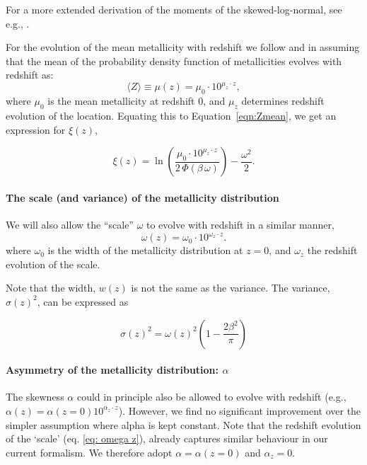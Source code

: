 \documentclass[twocolumn]{aastex631}
\begin{document}
For a more extended derivation of the moments of the skewed-log-normal, see e.g., \cite{WANG201995}.

\noindent For the evolution of the mean metallicity with redshift we follow \cite{Langer2006} and \cite{Neijssel+2019} in assuming that the mean of the probability density function of metallicities evolves with redshift as:
\begin{equation}
\label{eq: mean Z}
    \langle Z \rangle \equiv \mu(z) = \mu_0 \cdot 10^{\mu_z \cdot z},
\end{equation}
where $\mu_0
$ is the mean metallicity at redshift 0, and $\mu_z
$ determines redshift evolution of the location. Equating this to Equation~\ref{eqn:Zmean}, we get an expression for $\xi(z)$,


\begin{equation}
\label{eq mu z}
    \xi(z) = \ln\left(\frac{  \mu_0 \cdot 10^{\mu_z \cdot z} }{2\, \Phi(\beta\, \omega)}  \right) - \frac{\omega^2}{2}.
\end{equation}

\paragraph{The scale (and variance) of the metallicity distribution}

We will also allow the ``scale'' $\omega$ to evolve with redshift in a similar manner, 
\begin{equation}
\label{eq: omega z}
    \omega(z) = \omega_0 \cdot 10^{\omega_z \cdot z}.
\end{equation}
where $\omega_0$ is
the width of the metallicity distribution at $z=0$, and $\omega_z$
the redshift evolution of the scale.

Note that the width, $w(z)$ is not the same as the variance. The variance, $\sigma(z)^2$, can be expressed as

\begin{equation}
    \sigma(z)^2 = \omega(z)^2 \left( 1 - \frac{2\beta^2}{\pi} \right)
\end{equation}

\paragraph{Asymmetry of the metallicity distribution: $\alpha$}
The skewness $\alpha$ could in principle also be allowed to evolve with redshift (e.g., $\alpha (z) = \alpha(z=0) 10^{\alpha_z \cdot z}$). 
However, we find no significant improvement over the simpler assumption where alpha is kept constant. 
Note that the redshift evolution of the `scale' (eq. \ref{eq: omega z}), already captures similar behaviour in our current formalism. We therefore adopt $ \alpha = \alpha(z=0)$ and $\alpha_z = 0$.
\end{document}
